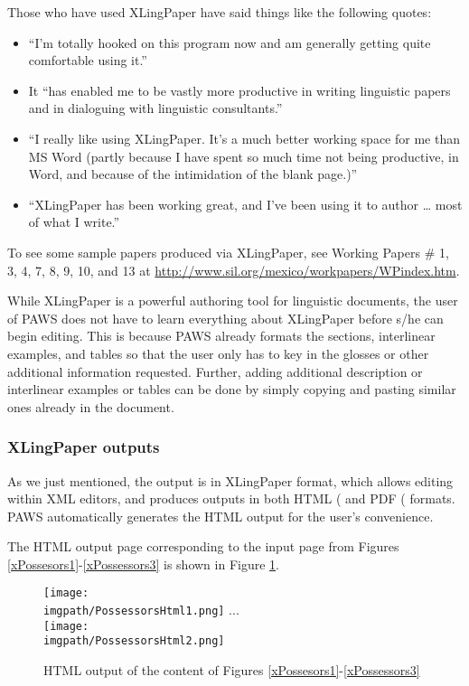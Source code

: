 Those who have used XLingPaper have said things like the following quotes:

\begin{itemize}
  \item ``I'm totally hooked on this program now and am generally getting quite comfortable using it.''
  \item It ``has enabled me to be vastly more productive in writing linguistic papers and in dialoguing with linguistic consultants.''
  \item ``I really like using XLingPaper.  It's a much better working space for me than MS Word (partly because I have spent so much time not being productive, in Word, and because of the intimidation of the blank page.)''
  \item ``XLingPaper has been working great, and I've been using it to author \dots{} most of what I write.''
\end{itemize}

To see some sample papers produced via XLingPaper, see Working Papers \# 1, 3, 4, 7, 8, 9, 10, and 13 at \url{http://www.sil.org/mexico/workpapers/WPindex.htm}.

While XLingPaper is a powerful authoring tool for linguistic documents, the user of {PAWS} does not have to learn everything about XLingPaper before s/he can begin editing. This is because {PAWS} already formats the sections, interlinear examples, and tables so that the user only has to key in the glosses or other additional information requested. Further, adding additional description or interlinear examples or tables can be done by simply copying and pasting similar ones already in the document.

\subsubsection{XLingPaper outputs}\label{sXLingPaperOutputs}
As we just mentioned, the output is in XLingPaper format, which allows editing within XML editors, and produces outputs in both HTML (\citet{rW3CHTML} and PDF (\citet{rISOPDF1.4} formats. {PAWS} automatically generates the HTML output for the user's convenience.

The HTML output page corresponding to the input page from Figures \ref{xPossesors1}-\ref{xPossessors3} 
is shown in Figure \ref{xPossessorsHtml2}.

\begin{figure}
\texttt{[image: \\imgpath/PossessorsHtml1.png]} 
...\\[1em]
\texttt{[image: \\imgpath/PossessorsHtml2.png]}
\caption{HTML output of the content of Figures  \ref{xPossesors1}-\ref{xPossessors3}}
  \label{xPossessorsHtml2}%
\end{figure}

